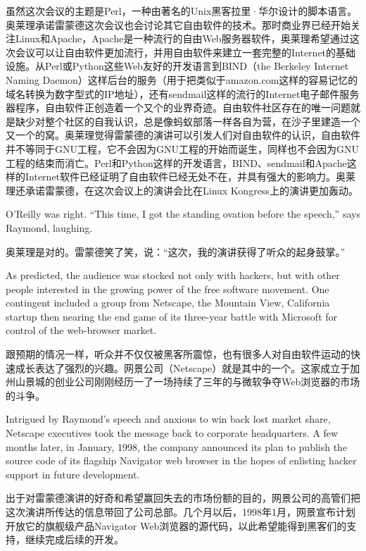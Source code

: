 \ifdefined\chs
虽然这次会议的主题是Perl，一种由著名的Unix黑客拉里·华尔设计的脚本语言。奥莱理承诺雷蒙德这次会议也会讨论其它自由软件的技术。那时商业界已经开始关注Linux和Apache，Apache是一种流行的自由Web服务器软件，奥莱理希望通过这次会议可以让自由软件更加流行，并用自由软件来建立一套完整的Internet的基础设施。从Perl或Python这些Web友好的开发语言到BIND（the Berkeley Internet Naming Daemon）这样后台的服务（用于把类似于amazon.com这样的容易记忆的域名转换为数字型式的IP地址），还有sendmail这样的流行的Internet电子邮件服务器程序，自由软件正创造着一个又个的业界奇迹。自由软件社区存在的唯一问题就是缺少对整个社区的自我认识，总是像蚂蚁部落一样各自为营，在沙子里建造一个又一个的窝。奥莱理觉得雷蒙德的演讲可以引发人们对自由软件的认识，自由软件并不等同于GNU工程，它不会因为GNU工程的开始而诞生，同样也不会因为GNU工程的结束而消亡。Perl和Python这样的开发语言，BIND、sendmail和Apache这样的Internet软件已经证明了自由软件已经无处不在，并具有强大的影响力。奥莱理还承诺雷蒙德，在这次会议上的演讲会比在Linux Kongress上的演讲更加轰动。
\fi

\ifdefined\eng
O'Reilly was right. ``This time, I got the standing ovation before the speech,'' says Raymond, laughing.
\fi

\ifdefined\chs
奥莱理是对的。雷蒙德笑了笑，说：``这次，我的演讲获得了听众的起身鼓掌。''
\fi

\ifdefined\eng
As predicted, the audience was stocked not only with hackers, but with other people interested in the growing power of the free software movement. One contingent included a group from Netscape, the Mountain View, California startup then nearing the end game of its three-year battle with Microsoft for control of the web-browser market.
\fi

\ifdefined\chs
跟预期的情况一样，听众并不仅仅被黑客所震惊，也有很多人对自由软件运动的快速成长表达了强烈的兴趣。网景公司（Netscape）就是其中的一个。这家成立于加州山景城的创业公司刚刚经历一了一场持续了三年的与微软争夺Web浏览器的市场的斗争。
\fi

\ifdefined\eng
Intrigued by Raymond's speech and anxious to win back lost market share, Netscape executives took the message back to corporate headquarters. A few months later, in January, 1998, the company announced its plan to publish the source code of its flagship Navigator web browser in the hopes of enlisting hacker support in future development.
\fi

\ifdefined\chs
出于对雷蒙德演讲的好奇和希望赢回失去的市场份额的目的，网景公司的高管们把这次演讲所传达的信息带回了公司总部。几个月以后，1998年1月，网景宣布计划开放它的旗舰级产品Navigator Web浏览器的源代码，以此希望能得到黑客们的支持，继续完成后续的开发。
\fi

